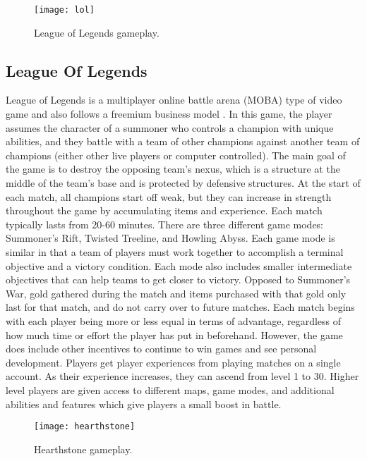 \begin{figure}[h]
\centering
\texttt{[image: lol]}
\caption{League of Legends gameplay.}
\end{figure}

\subsection{League Of Legends}
League of Legends is a multiplayer online battle arena (MOBA) type of video game and also follows a freemium business model  \cite{LeagueOfLegends}. In this game, the player assumes the character of a summoner who controls a champion with unique abilities, and they battle with a team of other champions against another team of champions (either other live players or computer controlled). The main goal of the game is to destroy the opposing team's nexus, which is a structure at the middle of the team's base and is protected by defensive structures. At the start of each match, all champions start off weak, but they can increase in strength throughout the game by accumulating items and experience. Each match typically lasts from 20-60 minutes. There are three different game modes: Summoner's Rift, Twisted Treeline, and Howling Abyss. Each game mode is similar in that a team of players must work together to accomplish a terminal objective and a victory condition. Each mode also includes smaller intermediate objectives that can help teams to get closer to victory. 
	Opposed to Summoner's War, gold gathered during the match and items purchased with that gold only last for that match, and do not carry over to future matches. Each match begins with each player being more or less equal in terms of advantage, regardless of how much time or effort the player has put in beforehand. 
	However, the game does include other incentives to continue to win games and see personal development. Players get player experiences from playing matches on a single account. As their experience increases, they can ascend from level 1 to 30. Higher level players are given access to different maps, game modes, and additional abilities and features which give players a small boost in battle. 
	
\begin{figure}[h]
\centering
\texttt{[image: hearthstone]}
\caption{Hearthstone gameplay.}
\end{figure}	
